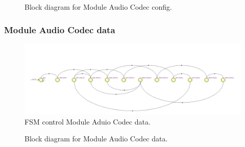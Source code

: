 \begin{figure}[H]
	\centering
	\caption{Block diagram for Module Audio Codec config.}
\end{figure}

\subsubsection{Module Audio Codec data}

\begin{figure}[H]
	\centering
	\includegraphics[width=.8\linewidth]{./my-chapters/my-diagrams/codec_data_reg_state.jpg}
	\caption{FSM control Module Aduio Codec data.}
\end{figure}

\begin{figure}[H]
	\centering
	\caption{Block diagram for Module Audio Codec data.}
\end{figure}